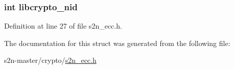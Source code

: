 \subsubsection[{\texorpdfstring{libcrypto\+\_\+nid}{libcrypto_nid}}]{\setlength{\rightskip}{0pt plus 5cm}int libcrypto\+\_\+nid}\hypertarget{structs2n__ecc__named__curve_a3f490463e3deacd512f6e95f6f906b75}{}\label{structs2n__ecc__named__curve_a3f490463e3deacd512f6e95f6f906b75}


Definition at line 27 of file s2n\+\_\+ecc.\+h.



The documentation for this struct was generated from the following file\+:\begin{DoxyCompactItemize}
\item 
s2n-\/master/crypto/\hyperlink{s2n__ecc_8h}{s2n\+\_\+ecc.\+h}\end{DoxyCompactItemize}
